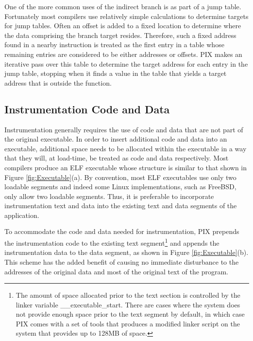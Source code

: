 One of the more common uses of the indirect branch is as part of a jump table. 
Fortunately most compilers use relatively simple calculations to determine targets for jump tables. 
Often an offset is added to a fixed location to determine where the data comprising the branch target
resides. Therefore, such a fixed address found in a nearby instruction 
is treated as the first entry in a table whose remaining entries are considered to be either addresses or offsets.
PIX makes an iterative pass over this table to determine the target 
address for each entry in the jump table, stopping when it finds a value in the
table that yields a target address that is outside the function.

\subsection{Instrumentation Code and Data}

Instrumentation generally requires the use of code and data that are not part of the original
executable. In order to insert additional code
and data into an executable, additional space needs to be allocated within the executable in a way that they
will, at load-time, be treated as code and data respectively. Most compilers produce an ELF executable whose
structure is similar to that shown in Figure \ref{fig:Executable}(a). By
convention, most ELF executables use only two loadable segments and indeed some Linux
implementations, such as FreeBSD, only allow two loadable segments. Thus, it is
preferable to incorporate instrumentation text and data into the
existing text and data segments of the application. 

To accommodate the code and data needed for instrumentation, PIX prepends the instrumentation code to the existing text
segment\footnote{The amount of space allocated prior to the text section is
controlled by the linker variable \_\_executable\_start. There are cases
where the system does not provide enough space prior to the text segment by
default, in which case PIX comes with a set of tools that produces a modified linker
script on the system that provides up to 128MB of space.} and appends the instrumentation data to the
data segment, as shown in Figure \ref{fig:Executable}(b). This
scheme has the added benefit of causing no immediate disturbance to the
addresses of the original data and most of the original text of the program.

